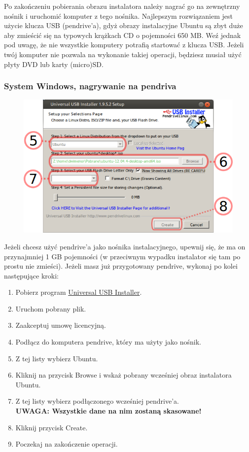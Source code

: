 Po zakończeniu pobierania obrazu instalatora należy nagrać go na zewnętrzny nośnik i uruchomić komputer z tego nośnika. Najlepszym rozwiązaniem jest użycie klucza USB (pendrive'a), gdyż obrazy instalacyjne Ubuntu są zbyt duże aby zmieścić się na typowych krążkach CD o pojemności 650 MB. Weź jednak pod uwagę, że nie wszystkie komputery potrafią startować z klucza USB. Jeżeli twój komputer nie pozwala na wykonanie takiej operacji, będziesz musiał użyć płyty DVD lub karty (micro)SD.
\subsubsection{System Windows, nagrywanie na pendriva}
\begin{figure}
                \includegraphics[width=\linewidth]{images/instalacja_nagrywanie_obrazu.png}
\end{figure}

Jeżeli chcesz użyć pendrive'a jako nośnika instalacyjnego, upewnij się, że ma on przynajmniej 1 GB pojemności (w przeciwnym wypadku instalator się tam po prostu nie zmieści). Jeżeli masz już przygotowany pendrive, wykonaj po kolei następujące kroki:
\begin{enumerate}[label=\protect\circled{\arabic*}]
\item Pobierz program \href{http://www.pendrivelinux.com/downloads/Universal-USB-Installer/Universal-USB-Installer-1.9.5.2.exe}{Universal USB Installer}.
\item Uruchom pobrany plik.
\item Zaakceptuj umowę licencyjną.
\item Podłącz do komputera pendrive, który ma użyty jako nośnik.
\item Z tej listy wybierz Ubuntu.
\item Kliknij na przycisk \textcolor{ubuntu_orange}{Browse} i wskaż pobrany wcześniej obraz instalatora Ubuntu.
\item Z tej listy wybierz podłączonego wcześniej pendrive'a.\\
\textbf{UWAGA: Wszystkie dane na nim zostaną skasowane!}
\item Kliknij przycisk \textcolor{ubuntu_orange}{Create}.
\item Poczekaj na zakończenie operacji.
\end{enumerate}
\clearpage
